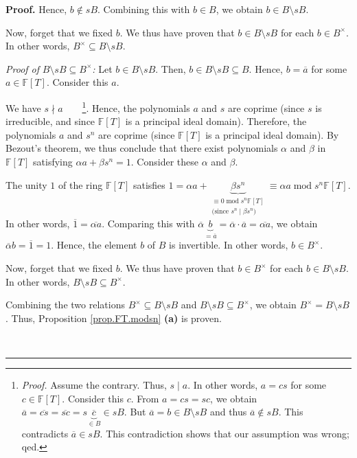\documentclass[numbers=enddot,12pt,final,onecolumn,notitlepage]{scrartcl}%
\theoremstyle{definition}
\newenvironment{proof}[1][Proof]{\noindent\textbf{#1.} }{\ \rule{0.5em}{0.5em}}
\begin{document}
\begin{proof}
Hence, $b\notin sB$. Combining this with $b\in B$, we obtain $b\in B\setminus
sB$.

Now, forget that we fixed $b$. We thus have proven that $b\in B\setminus sB$
for each $b\in B^{\times}$. In other words, $B^{\times}\subseteq B\setminus
sB$.

\textit{Proof of }$B\setminus sB\subseteq B^{\times}$\textit{:} Let $b\in
B\setminus sB$. Then, $b\in B\setminus sB\subseteq B$. Hence, $b=\overline{a}$
for some $a\in\mathbb{F}\left[  T\right]  $. Consider this $a$.

We have $s\nmid a$\ \ \ \ \footnote{\textit{Proof.} Assume the contrary. Thus,
$s\mid a$. In other words, $a=cs$ for some $c\in\mathbb{F}\left[  T\right]  $.
Consider this $c$. From $a=cs=sc$, we obtain $\overline{a}=\overline
{cs}=\overline{sc}=s\underbrace{\overline{c}}_{\in B}\in sB$. But
$\overline{a}=b\in B\setminus sB$ and thus $\overline{a}\notin sB$. This
contradicts $\overline{a}\in sB$. This contradiction shows that our assumption
was wrong; qed.}. Hence, the polynomials $a$ and $s$ are coprime (since $s$ is
irreducible, and since $\mathbb{F}\left[  T\right]  $ is a principal ideal
domain). Therefore, the polynomials $a$ and $s^{n}$ are coprime (since
$\mathbb{F}\left[  T\right]  $ is a principal ideal domain). By Bezout's
theorem, we thus conclude that there exist polynomials $\alpha$ and $\beta$ in
$\mathbb{F}\left[  T\right]  $ satisfying $\alpha a+\beta s^{n}=1$. Consider
these $\alpha$ and $\beta$.

The unity $1$ of the ring $\mathbb{F}\left[  T\right]  $ satisfies $1=\alpha
a+\underbrace{\beta s^{n}}_{\substack{\equiv0\operatorname{mod}s^{n}%
\mathbb{F}\left[  T\right]  \\\text{(since }s^{n}\mid\beta s^{n}\text{)}%
}}\equiv\alpha a\operatorname{mod}s^{n}\mathbb{F}\left[  T\right]  $. In other
words, $\overline{1}=\overline{\alpha a}$. Comparing this with $\overline
{\alpha}\underbrace{b}_{=\overline{a}}=\overline{\alpha}\cdot\overline
{a}=\overline{\alpha a}$, we obtain $\overline{\alpha}b=\overline{1}=1$.
Hence, the element $b$ of $B$ is invertible. In other words, $b\in B^{\times}$.

Now, forget that we fixed $b$. We thus have proven that $b\in B^{\times}$ for
each $b\in B\setminus sB$. In other words, $B\setminus sB\subseteq B^{\times}$.

Combining the two relations $B^{\times}\subseteq B\setminus sB$ and
$B\setminus sB\subseteq B^{\times}$, we obtain $B^{\times}=B\setminus sB$.
Thus, Proposition \ref{prop.FT.modsn} \textbf{(a)} is proven.


\end{proof}
\end{document}

